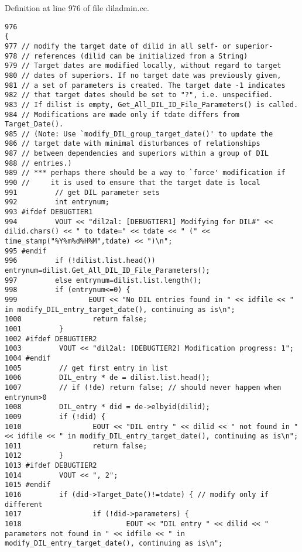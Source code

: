 Definition at line 976 of file diladmin.cc.



\footnotesize\begin{verbatim}976                                                                                             {
977 // modify the target date of dilid in all self- or superior-
978 // references (dilid can be initialized from a String)
979 // Target dates are modified locally, without regard to target
980 // dates of superiors. If no target date was previously given,
981 // a set of parameters is created. The target date -1 indicates
982 // that target dates should be set to "?", i.e. unspecified.
983 // If dilist is empty, Get_All_DIL_ID_File_Parameters() is called.
984 // Modifications are made only if tdate differs from Target_Date().
985 // (Note: Use `modify_DIL_group_target_date()' to update the
986 // target date with minimal disturbances of relationships
987 // between dependencies and superiors within a group of DIL
988 // entries.)
989 // *** perhaps there should be a way to `force' modification if
990 //     it is used to ensure that the target date is local
991         // get DIL parameter sets
992         int entrynum;
993 #ifdef DEBUGTIER1
994         VOUT << "dil2al: [DEBUGTIER1] Modifying for DIL#" << dilid.chars() << " to tdate=" << tdate << " (" << time_stamp("%Y%m%d%H%M",tdate) << ")\n";
995 #endif
996         if (!dilist.list.head()) entrynum=dilist.Get_All_DIL_ID_File_Parameters();
997         else entrynum=dilist.list.length();
998         if (entrynum<=0) {
999                 EOUT << "No DIL entries found in " << idfile << " in modify_DIL_entry_target_date(), continuing as is\n";
1000                 return false;
1001         }
1002 #ifdef DEBUGTIER2
1003         VOUT << "dil2al: [DEBUGTIER2] Modification progress: 1";
1004 #endif
1005         // get first entry in list
1006         DIL_entry * de = dilist.list.head();
1007         // if (!de) return false; // should never happen when entrynum>0
1008         DIL_entry * did = de->elbyid(dilid);
1009         if (!did) {
1010                 EOUT << "DIL entry " << dilid << " not found in " << idfile << " in modify_DIL_entry_target_date(), continuing as is\n";
1011                 return false;
1012         }
1013 #ifdef DEBUGTIER2
1014         VOUT << ", 2";
1015 #endif
1016         if (did->Target_Date()!=tdate) { // modify only if different
1017                 if (!did->parameters) {
1018                         EOUT << "DIL entry " << dilid << " parameters not found in " << idfile << " in modify_DIL_entry_target_date(), continuing as is\n";

\end{verbatim}
